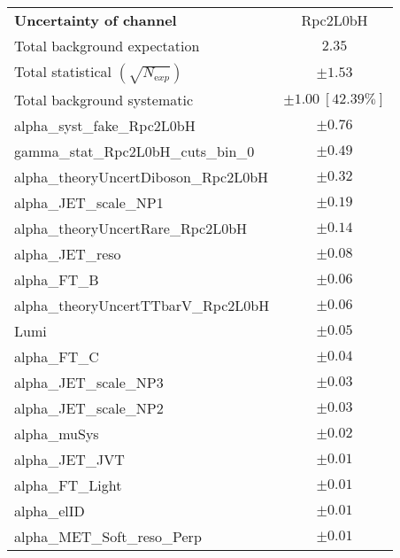 
\begin{table}
\begin{center}
\setlength{\tabcolsep}{0.0pc}
\begin{tabular*}{\textwidth}{@{\extracolsep{\fill}}lc}
\noalign{\smallskip}\hline\noalign{\smallskip}
{\bfseries Uncertainty of channel}                                    & Rpc2L0bH            \\
\noalign{\smallskip}\hline\noalign{\smallskip}
Total background expectation             &  $2.35$       \\
\noalign{\smallskip}\hline\noalign{\smallskip}
Total statistical $(\sqrt{N_{\mathrm exp}})$              & $\pm 1.53$       \\
Total background systematic               & $\pm 1.00\ [42.39\%] $             \\
\noalign{\smallskip}\hline\noalign{\smallskip}
\noalign{\smallskip}\hline\noalign{\smallskip}
alpha\_syst\_fake\_Rpc2L0bH         & $\pm 0.76$       \\
gamma\_stat\_Rpc2L0bH\_cuts\_bin\_0         & $\pm 0.49$       \\
alpha\_theoryUncertDiboson\_Rpc2L0bH         & $\pm 0.32$       \\
alpha\_JET\_scale\_NP1         & $\pm 0.19$       \\
alpha\_theoryUncertRare\_Rpc2L0bH         & $\pm 0.14$       \\
alpha\_JET\_reso         & $\pm 0.08$       \\
alpha\_FT\_B         & $\pm 0.06$       \\
alpha\_theoryUncertTTbarV\_Rpc2L0bH         & $\pm 0.06$       \\
Lumi         & $\pm 0.05$       \\
alpha\_FT\_C         & $\pm 0.04$       \\
alpha\_JET\_scale\_NP3         & $\pm 0.03$       \\
alpha\_JET\_scale\_NP2         & $\pm 0.03$       \\
alpha\_muSys         & $\pm 0.02$       \\
alpha\_JET\_JVT         & $\pm 0.01$       \\
alpha\_FT\_Light         & $\pm 0.01$       \\
alpha\_elID         & $\pm 0.01$       \\
alpha\_MET\_Soft\_reso\_Perp         & $\pm 0.01$       \\

\end{tabular*}
\end{center}
\end{table}
